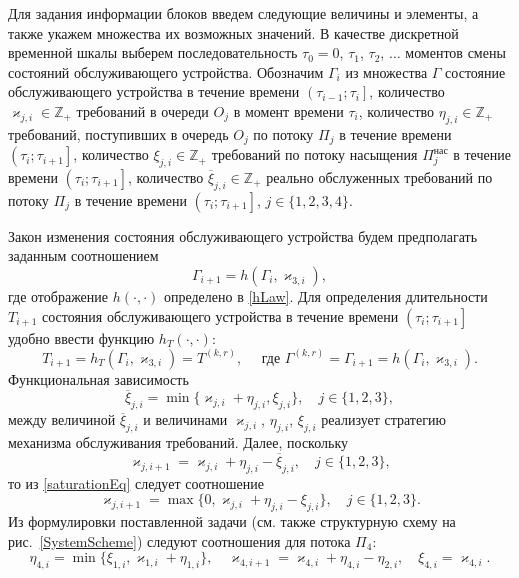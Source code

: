 \documentclass[a4paper,12pt,russian]{extarticle}
\newcommand{\ga}[1]{\Gamma^{\left( #1 \right)} }
\begin{document}
Для задания информации блоков введем следующие величины и элементы, а также укажем множества их возможных значений. В качестве дискретной временной шкалы выберем последовательность $\tau_0=0$, $\tau_1$, $\tau_2$, $\ldots$ моментов смены состояний обслуживающего устройства. Обозначим $\Gamma_i$ из множества $\Gamma$ состояние обслуживающего устройства в течение времени $\left(\tau_{i-1};\tau_i\right]$, количество $\varkappa_{j,i} \in \mathbb{Z}_+ $ требований в очереди $O_j$ в момент времени $\tau_i$, количество $\eta_{j,i} \in \mathbb{Z}_+$ требований, поступивших в очередь $O_j$ по потоку $\Pi_j$ в течение времени $\left(\tau_{i};\tau_{i+1}\right]$, количество $\xi_{j,i} \in \mathbb{Z}_+$ требований по потоку насыщения $\Pi^{\mathrm{\text{нас}}}_j$ в течение времени $\left(\tau_{i};\tau_{i+1}\right]$, количество $\overline{\xi}_{j,i}\in \mathbb{Z}_+$ реально обслуженных требований по потоку $\Pi_j$ в течение времени $\left(\tau_{i};\tau_{i+1}\right]$, $j\in \{1,2,3,4\}$.

Закон изменения состояния обслуживающего устройства будем предполагать заданным соотношением 
\begin{equation}
\Gamma_{i+1}=h(\Gamma_i,\varkappa_{3,i}),
\label{gammaFunc}
\end{equation}
где отображение $h(\cdot,\cdot)$ определено в \eqref{hLaw}.
Для определения длительности $T_{i+1}$ состояния обслуживающего устройства в течение времени $\left(\tau_{i};\tau_{i+1}\right]$ удобно ввести функцию $h_T(\cdot,\cdot)$:
\begin{equation*}
T_{i+1}=h_T(\Gamma_i,\varkappa_{3,i})= T^{(k,r)},\quad  \text{ где } \ga{k,r}=\Gamma_{i+1}=h(\Gamma_i,\varkappa_{3,i}).
\end{equation*}
Функциональная зависимость
\begin{equation}
\overline{\xi}_{j,i}=\min\{\varkappa_{j,i}+\eta_{j,i},\xi_{j,i}\}, \quad j\in \{1,2,3\},
\label{saturationEq}
\end{equation}
между величиной $\overline{\xi}_{j,i}$ и величинами $\varkappa_{j,i}$, $\eta_{j,i}$, $\xi_{j,i}$ реализует стратегию механизма обслуживания требований. Далее, поскольку 
\begin{equation*}
\varkappa_{j,i+1}=\varkappa_{j,i}+\eta_{j,i}-\overline{\xi}_{j,i}, \quad  j\in \{1,2,3\},
\end{equation*}
то из \eqref{saturationEq} следует соотношение
\begin{equation}
\varkappa_{j,i+1}=\max\{{0,\varkappa_{j,i}+\eta_{j,i}-\xi_{j,i}}\}, \quad j\in \{1,2,3\}.
\label{queuesFunc}
\end{equation}
Из формулировки поставленной задачи (см. также структурную схему на рис.~\ref{SystemScheme}) следуют соотношения для потока $\Pi_4$:
\begin{equation}
\eta_{4,i} = \min\{\xi_{1,i}, \varkappa_{1,i}+\eta_{1,i}\}, \quad \varkappa_{4,i+1}=\varkappa_{4,i}+\eta_{4,i}-\eta_{2,i}, \quad \xi_{4,i} = \varkappa_{4,i}.
\label{FourthFunc}
\end{equation}
\end{document}
